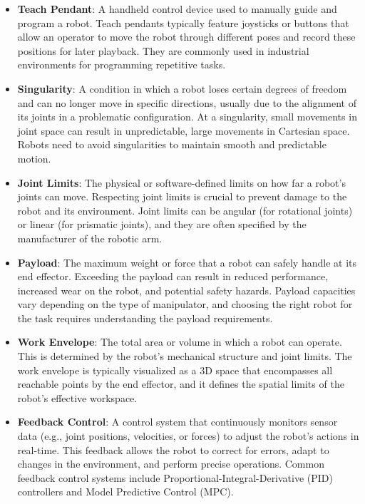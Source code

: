 \documentclass{article}
\begin{document}
\begin{itemize}
    \item \textbf{Teach Pendant}: 
    A handheld control device used to manually guide and program a robot. Teach pendants typically feature joysticks or buttons that allow an operator to move the robot through different poses and record these positions for later playback. They are commonly used in industrial environments for programming repetitive tasks.

    \item \textbf{Singularity}: 
    A condition in which a robot loses certain degrees of freedom and can no longer move in specific directions, usually due to the alignment of its joints in a problematic configuration. At a singularity, small movements in joint space can result in unpredictable, large movements in Cartesian space. Robots need to avoid singularities to maintain smooth and predictable motion.

    \item \textbf{Joint Limits}: 
    The physical or software-defined limits on how far a robot’s joints can move. Respecting joint limits is crucial to prevent damage to the robot and its environment. Joint limits can be angular (for rotational joints) or linear (for prismatic joints), and they are often specified by the manufacturer of the robotic arm.

    \item \textbf{Payload}: 
    The maximum weight or force that a robot can safely handle at its end effector. Exceeding the payload can result in reduced performance, increased wear on the robot, and potential safety hazards. Payload capacities vary depending on the type of manipulator, and choosing the right robot for the task requires understanding the payload requirements.

    \item \textbf{Work Envelope}: 
    The total area or volume in which a robot can operate. This is determined by the robot’s mechanical structure and joint limits. The work envelope is typically visualized as a 3D space that encompasses all reachable points by the end effector, and it defines the spatial limits of the robot's effective workspace.

    \item \textbf{Feedback Control}: 
    A control system that continuously monitors sensor data (e.g., joint positions, velocities, or forces) to adjust the robot's actions in real-time. This feedback allows the robot to correct for errors, adapt to changes in the environment, and perform precise operations. Common feedback control systems include Proportional-Integral-Derivative (PID) controllers and Model Predictive Control (MPC).
\end{itemize}
\end{document}
